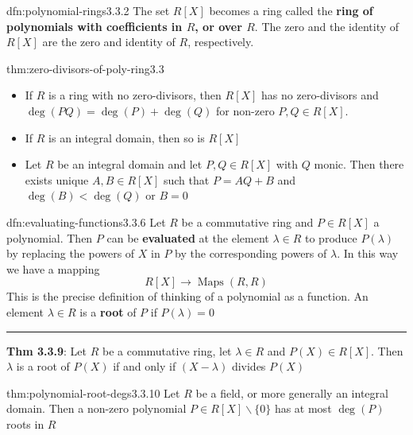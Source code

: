 \documentclass[landscape, 8pt]{extarticle}
\DeclareMathOperator{\Maps}{Maps}
\begin{document}
\begin{multicols}{3}
\begin{dfn}{dfn:polynomial-rings}{3.3.2}
    The set $R[X]$ becomes a ring called the \textbf{ring of polynomials with coefficients in $R$, or over $R$}. The zero and the identity of $R[X]$ are the zero and identity of $R$, respectively.
\end{dfn}


\begin{thm}{thm:zero-divisors-of-poly-ring}{3.3}
    \begin{itemize}
        \setlength\itemsep{0em}
        \item[\textbf{3.3.3}:] If $R$ is a ring with no zero-divisors, then $R[X]$ has no zero-divisors and $\deg(PQ) = \deg(P) + \deg(Q)$ for non-zero $P,Q\in R[X]$.
        \item If $R$ is an integral domain, then so is $R[X]$
        \item[\textbf{3.3.4}:] Let $R$ be an integral domain and let $P, Q\in R[X]$ with $Q$ monic. Then there exists unique $A,B\in R[X]$ such that $P = AQ + B$ and $\deg(B) < \deg(Q)$ or $B = 0$
    \end{itemize}
\end{thm}

\newpage

\begin{dfn}{dfn:evaluating-functions}{3.3.6}
    Let $R$ be a commutative ring and $P\in R[X]$ a polynomial. Then $P$ can be \textbf{evaluated} at the element $\lambda\in R$ to produce $P(\lambda)$ by replacing the powers of $X$ in $P$ by the corresponding powers of $\lambda$. In this way we have a mapping
    \[R[X] \to \Maps(R, R)\]
    This is the precise definition of thinking of a polynomial as a function. An element $\lambda\in R$ is a \textbf{root} of $P$ if $P(\lambda) = 0$

    \noindent\rule{\textwidth}{0.2pt}
    \textbf{Thm 3.3.9}: Let $R$ be a commutative ring, let $\lambda\in R$ and $P(X)\in R[X]$. Then $\lambda$ is a root of $P(X)$ if and only if $(X - \lambda)$ divides $P(X)$
\end{dfn}

\begin{thm}{thm:polynomial-root-degs}{3.3.10}
    Let $R$ be a field, or more generally an integral domain. Then a non-zero polynomial $P\in R[X] \backslash \{0\}$ has at most $\deg(P)$ roots in $R$
\end{thm}


\end{multicols}
\end{document}

